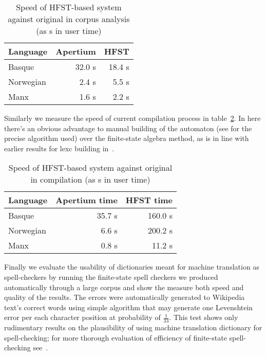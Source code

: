 \documentclass[a4paper]{article}
\begin{document}
\begin{table}[h]
\begin{center}
\begin{tabular}{|l|r|r|}
\hline
\bf Language & \bf Apertium & \bf HFST \\
\hline
Basque       & 32.0 s& 18.4 s \\
Norwegian    & 2.4 s & 5.5  s \\
Manx         & 1.6 s & 2.2  s \\
\hline
\end{tabular}
\caption{Speed of HFST-based system against original in corpus analysis
 (as s in user time)
\label{table:speed}}
\end{center}
\end{table}

Similarly we measure the speed of current compilation process in 
table~\ref{table:compile-speed}. In here there's an obvious advantage to
manual building of the automaton (see \cite{rojas2005} for the precise algorithm
used) over the finite-state algebra method, as is
in line with earlier results for lexc building in~\cite{pirinen/2009/sfcm}.

\begin{table}[h]
\begin{center}
\begin{tabular}{|l|r|r|}
\hline
\bf Language & \bf Apertium time & \bf HFST time \\
\hline
Basque       & 35.7 s & 160.0  s \\
Norwegian    & 6.6 s  & 200.2 s \\
Manx         & 0.8 s  & 11.2  s \\
\hline
\end{tabular}
\caption{Speed of HFST-based system against original in compilation
 (as s in user time)
\label{table:compile-speed}}
\end{center}
\end{table}

Finally we evaluate the usability of dictionaries meant for machine translation
as spell-checkers by running the finite-state spell checkers we produced
automatically through a large corpus and show the measure both speed and
quality of the results. The errors were automatically generated to Wikipedia
text's correct words using simple algorithm that may generate one Levenshtein
error per each character position at probability of $\frac{1}{33}$.  This test
shows only rudimentary results on the plausibility of using machine translation
dictionary for spell-checking; for more thorough evaluation of efficiency of
finite-state spell-checking see~\cite{hassan/2008}.
\end{document}
